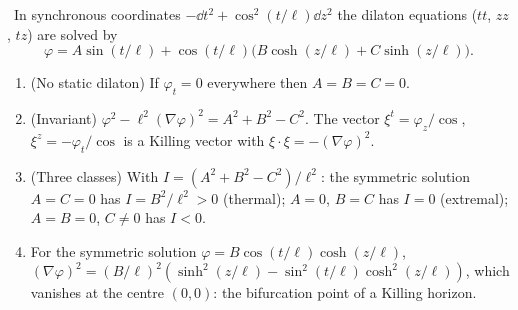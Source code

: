 \begin{theorem}\label{thm:dilaton}\ver\
In synchronous coordinates $-\dd t^2+\cos^2(t/\ell)\dd z^2$ the dilaton equations ($tt$, $zz$, $tz$) are solved by
\[
\varphi=A\sin(t/\ell)+\cos(t/\ell)\bigl(B\cosh(z/\ell)+C\sinh(z/\ell)\bigr).
\]
\begin{enumerate}[label=(\roman*)]
\item (No static dilaton) If $\varphi_t=0$ everywhere then $A=B=C=0$.
\item (Invariant) $\varphi^2-\ell^2(\nabla\varphi)^2=A^2+B^2-C^2$. The vector $\xi^t=\varphi_z/\cos$, $\xi^z=-\varphi_t/\cos$ is a Killing vector with $\xi\cdot\xi=-(\nabla\varphi)^2$.
\item (Three classes) With $I=(A^2+B^2-C^2)/\ell^2$: the symmetric solution $A=C=0$ has $I=B^2/\ell^2>0$ (thermal); $A=0$, $B=C$ has $I=0$ (extremal); $A=B=0$, $C\ne0$ has $I<0$.
\item For the symmetric solution $\varphi=B\cos(t/\ell)\cosh(z/\ell)$, $(\nabla\varphi)^2=(B/\ell)^2(\sinh^2(z/\ell)-\sin^2(t/\ell)\cosh^2(z/\ell))$, which vanishes at the centre $(0,0)$: the bifurcation point of a Killing horizon.
\end{enumerate}
\end{theorem}
